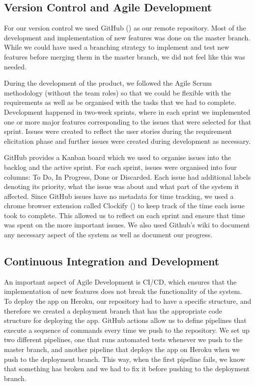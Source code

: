 \documentclass{l4proj}
\begin{document}
\subsection{Version Control and Agile Development}
For our version control we used GitHub (\cite{github}) as our remote repository. Most of the development and implementation of new features was done on the master branch. While we could have used a branching strategy to implement and test new features before merging them in the master branch, we did not feel like this was needed.

During the development of the product, we followed the Agile Scrum methodology (without the team roles) so that we could be flexible with the requirements as well as be organised with the tasks that we had to complete. Development happened in two-week sprints, where in each sprint we implemented one or more major features corresponding to the issues that were selected for that sprint. Issues were created to reflect the user stories during the requirement elicitation phase and further issues were created during development as necessary. 

GitHub provides a Kanban board which we used to organise issues into the backlog and the active sprint. For each sprint, issues were organised into four columns: To Do, In Progress, Done or Discarded. Each issue had additional labels denoting its priority, what the issue was about and what part of the system it affected. Since GitHub issues have no metadata for time tracking, we used a chrome browser extension called Clockify (\cite{clock}) to keep track of the time each issue took to complete. This allowed us to reflect on each sprint and ensure that time was spent on the more important issues. We also used Github's wiki to document any necessary aspect of the system as well as document our progress.

\subsection{Continuous Integration and Development}
An important aspect of Agile Development is CI/CD, which ensures that the implementation of new features does not break the functionality of the system. To deploy the app on Heroku, our repository had to have a specific structure, and therefore we created a deployment branch that has the appropriate code structure for deploying the app. GitHub actions allow us to define pipelines that execute a sequence of commands every time we push to the repository. We set up two different pipelines, one that runs automated tests whenever we push to the master branch, and another pipeline that deploys the app on Heroku when we push to the deployment branch. This way, when the first pipeline fails, we know that something has broken and we had to fix it before pushing to the deployment branch.
\end{document}

